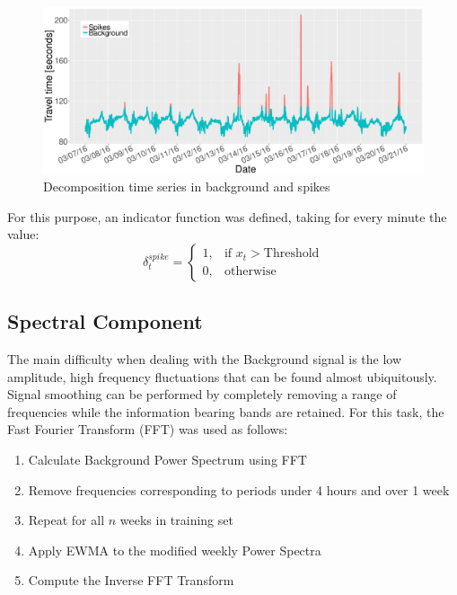 \documentclass[letterpaper, 10 pt, conference]{ieeeconf}  %
\begin{document}
\begin{figure}[htbp]
	\centering
	\includegraphics[width=\linewidth]{BS.pdf}
	\caption{ Decomposition time series in background and spikes }
	\label{fig:Background}
\end{figure}

For this purpose, an indicator function was defined, taking for every minute the value:
\begin{equation}
    \delta_t^{spike}=
    \begin{cases}
      1, & \text{if } x_t > \text{Threshold}\\
      0, & \text{otherwise}
    \end{cases}
    \label{delta}
  \end{equation}

\subsection{Spectral Component}
The main difficulty when dealing with the Background signal is the low amplitude, high frequency fluctuations that can be found almost ubiquitously. 
Signal smoothing can be performed by completely removing a range of frequencies while the information bearing bands are retained. For this task, the Fast Fourier Transform (FFT) \cite{FFT} was used as follows:
\begin{enumerate}

	\item Calculate Background Power Spectrum using FFT
	\item Remove frequencies corresponding to periods under 4 hours and over 1 week
	\item Repeat for all $n$ weeks in training set
    \item Apply EWMA to the modified weekly Power Spectra
	\item Compute the Inverse FFT Transform

\end{enumerate}
\end{document}
